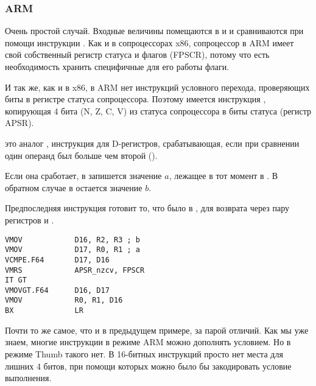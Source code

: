 \subsubsection{ARM}

\myparagraph{\OptimizingXcodeIV (\ARMMode)}



Очень простой случай.
Входные величины помещаются в  и  и сравниваются при помощи инструкции .
Как и в сопроцессорах x86, сопроцессор в ARM имеет свой собственный регистр статуса и флагов (\ac{FPSCR}),
потому что есть необходимость хранить специфичные для его работы флаги.

И так же, как и в x86, 
в ARM нет инструкций условного перехода, проверяющих биты в регистре статуса сопроцессора. 
Поэтому имеется инструкция , копирующая 4 бита (N, Z, C, V) 
из статуса сопроцессора в биты  статуса (регистр \ac{APSR}).

 это аналог , инструкция для D-регистров, срабатывающая, если при сравнении один операнд был больше чем второй
(). 

Если она сработает, 
в  запишется значение $a$, лежащее в тот момент в .
В обратном случае в  остается значение $b$.


Предпоследняя инструкция  готовит то, что было в , для возврата через 
пару регистров  и .

\myparagraph{\OptimizingXcodeIV (\ThumbTwoMode)}

\begin{lstlisting}[caption=\OptimizingXcodeIV (\ThumbTwoMode),style=customasmARM]
VMOV            D16, R2, R3 ; b
VMOV            D17, R0, R1 ; a
VCMPE.F64       D17, D16
VMRS            APSR_nzcv, FPSCR
IT GT 
VMOVGT.F64      D16, D17
VMOV            R0, R1, D16
BX              LR
\end{lstlisting}

Почти то же самое, что и в предыдущем примере, за парой отличий.
Как мы уже знаем, многие инструкции в режиме ARM можно дополнять условием.
Но в режиме Thumb такого нет.
В 16-битных инструкций просто нет места для лишних 4 битов, при помощи
которых можно было бы закодировать условие выполнения.

